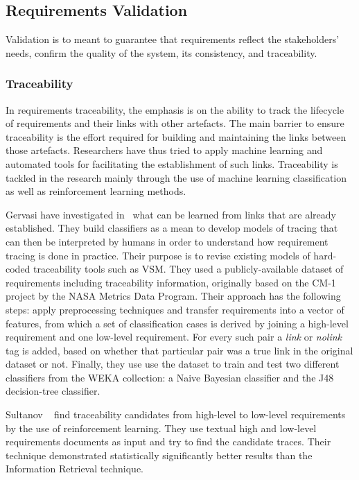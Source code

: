 \subsection{Requirements Validation}

Validation is to meant to guarantee that requirements reflect the
stakeholders' needs, confirm the quality of the system, its consistency, and
traceability.

\subsubsection{Traceability}

In requirements traceability, the emphasis is on the ability to track the
lifecycle of requirements and their links with other artefacts. The main barrier
to ensure traceability is the effort required for building and maintaining the
links between those artefacts. Researchers have thus tried to apply
machine learning and automated tools for facilitating the establishment of such
links\cite{Gervasi:2011}.
Traceability is tackled in the research mainly through the use of machine
learning classification as well as reinforcement learning methods.

Gervasi \etal have investigated in~\cite{Gervasi:2011} what can be learned from
links that are already established. They build classifiers as a mean to develop models
of tracing that can then be interpreted by humans in order to understand how
requirement tracing is done in practice. Their purpose is to revise existing models of
hard-coded traceability tools such as VSM. They used a publicly-available
dataset of requirements including traceability information, originally based on
the CM-1 project by the NASA Metrics Data Program. Their approach has the following
steps: apply preprocessing techniques and transfer requirements into a
vector of features, from which a set of classification cases is derived by
joining a high-level requirement and one low-level requirement. For every such
pair a \textit{link} or \textit{nolink} tag is added, based on whether that
particular pair was a true link in the original dataset or not. Finally, they
use use the dataset to train and test two different classifiers from the WEKA
collection: a Naive Bayesian classifier and the J48 decision-tree classifier.

Sultanov \etal~\cite{Sultanov:2013} find traceability candidates from
high-level to low-level requirements by the use of reinforcement
learning. They use textual high and low-level requirements documents as input and try to
find the candidate traces. Their technique demonstrated statistically
significantly better results than the Information Retrieval
technique.





